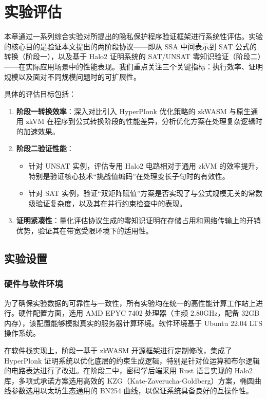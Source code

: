 \chapter{实验评估}
\label{chapter:evaluation}

本章通过一系列综合实验对所提出的隐私保护程序验证框架进行系统性评估。实验的核心目的是验证本文提出的两阶段协议——即从 SSA 中间表示到 SAT 公式的转换（阶段一），以及基于 Halo2 证明系统的 SAT/UNSAT 零知识验证（阶段二）——在实际应用场景中的性能表现。我们重点关注三个关键指标：执行效率、证明规模以及面对不同规模问题时的可扩展性。

具体的评估目标包括：
\begin{enumerate}
    \item \textbf{阶段一转换效率}：深入对比引入 HyperPlonk 优化策略的 zkWASM 与原生通用 zkVM 在程序到公式转换阶段的性能差异，分析优化方案在处理复杂逻辑时的加速效果。
    \item \textbf{阶段二验证性能}：
    \begin{itemize}
        \item 针对 UNSAT 实例，评估专用 Halo2 电路相对于通用 zkVM 的效率提升，特别是验证核心技术“挑战值编码”在处理变长子句时的有效性。
        \item 针对 SAT 实例，验证“双矩阵赋值”方案是否实现了与公式规模无关的常数级验证复杂度，以及其在并行约束检查中的表现。
    \end{itemize}
    \item \textbf{证明紧凑性}：量化评估协议生成的零知识证明在存储占用和网络传输上的开销优势，验证其在带宽受限环境下的适用性。
\end{enumerate}

\section{实验设置}

\subsection{硬件与软件环境}
为了确保实验数据的可靠性与一致性，所有实验均在统一的高性能计算工作站上进行。硬件配置方面，选用 AMD EPYC 7402 处理器（主频 2.80GHz，配备 32GB 内存），该配置能够模拟真实的服务器计算环境。软件环境基于 Ubuntu 22.04 LTS 操作系统。

在软件栈实现上，阶段一基于 zkWASM 开源框架进行定制修改，集成了 HyperPlonk 证明系统以优化底层的约束生成逻辑，特别是针对位运算和布尔逻辑的电路表达进行了改进。在阶段二中，密码学后端采用 Rust 语言实现的 Halo2 库，多项式承诺方案选用高效的 KZG（Kate-Zaverucha-Goldberg）方案，椭圆曲线参数选用以太坊生态通用的 BN254 曲线，以保证系统具备良好的互操作性。

